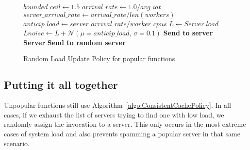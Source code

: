 
\begin{figure}
  \begin{algorithmic}[1]
    \State $bounded\_ceil \gets 1.5$
    \State $arrival\_rate \gets 1.0 / avg\_iat$
    \State $server\_arrival\_rate \gets arrival\_rate / len(workers)$
    \State $anticip\_load \gets server\_arrival\_rate / worker\_cpus$
      \State $L \gets Server.load$
      \State $Lnoise \gets L + \mathcal{N}(\mu=anticip\_load,\,\sigma=0.1)$
        \State \textbf{Send to server Server}
      \EndIf
    \EndFor
    \State \textbf{Send to random server}
    \end{algorithmic}
\caption{Random Load Update Policy for popular functions}
\label{algo:PopularRLUPolicy}    
\end{figure}


\subsection{Putting it all together}

Unpopular functions still use Algorithm~\ref{algo:ConsistentCachePolicy}.
In all cases, if we exhaust the list of servers trying to find one with low load, we randomly assign the invocation to a server.
This only occurs in the most extreme cases of system load and also prevents spamming a popular server in that same scenario.

